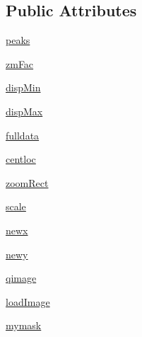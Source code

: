 \subsection*{Public Attributes}
\begin{DoxyCompactItemize}
\item 
\hyperlink{classmy_zm_display_1_1my_zm_display_ae957c679b9db235efff6747602ef60df}{peaks}
\item 
\hyperlink{classmy_zm_display_1_1my_zm_display_aaec1992079d9eaf789ed0e65cd55b99d}{zm\-Fac}
\item 
\hyperlink{classmy_zm_display_1_1my_zm_display_ab8eb21cf700300335ca6dedd71ccaba1}{disp\-Min}
\item 
\hyperlink{classmy_zm_display_1_1my_zm_display_ac03bdd7f4276b3d0aefe0dc7827143bc}{disp\-Max}
\item 
\hyperlink{classmy_zm_display_1_1my_zm_display_a108eff552f2c0e09db6c9d7ab2bdd401}{fulldata}
\item 
\hyperlink{classmy_zm_display_1_1my_zm_display_a97229acfaee29c678542d4c5f8cae694}{centloc}
\item 
\hyperlink{classmy_zm_display_1_1my_zm_display_a7aec333c091a737ace35d96d4a4e2991}{zoom\-Rect}
\item 
\hyperlink{classmy_zm_display_1_1my_zm_display_a27b868f986854ed524c451797f248028}{scale}
\item 
\hyperlink{classmy_zm_display_1_1my_zm_display_a54ce03f488e6c7852c76aca77a5c3895}{newx}
\item 
\hyperlink{classmy_zm_display_1_1my_zm_display_a736a1b9ec07a3565161b71961923da74}{newy}
\item 
\hyperlink{classmy_zm_display_1_1my_zm_display_ad535c3b024aab5d1cec5e6646e2bf60f}{qimage}
\item 
\hyperlink{classmy_zm_display_1_1my_zm_display_afd39f4afb5f5dc21acf35c5e6f050379}{load\-Image}
\item 
\hyperlink{classmy_zm_display_1_1my_zm_display_a10b4f37676eb840f0c9307365ea2dd48}{mymask}
\end{DoxyCompactItemize}
